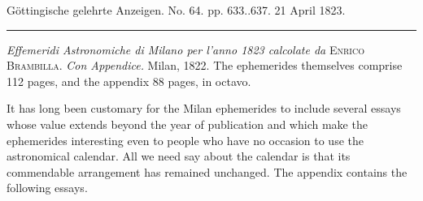 \clearpage
{}
\begin{center}\small Göttingische gelehrte Anzeigen. No. 64. pp. 633..637. 21 April 1823.\\[3pt]\rule{.72\linewidth}{.3pt}\end{center}

\emph{Effemeridi Astronomiche di Milano per l'anno \textup{1823} calcolate da} \textsc{Enrico Brambilla}. \emph{Con Appendice.} Milan, 1822. The ephemerides themselves comprise 112 pages, and the appendix 88 pages, in octavo.

\begingroup\baselineskip=12.5pt\relax
It has long been customary for the Milan ephemerides to include several essays whose value extends beyond the year of publication and which make the ephemerides interesting even to people who have no occasion to use the astronomical calendar.
All we need say about the calendar is that its commendable arrangement has remained unchanged. The appendix contains the following essays.

